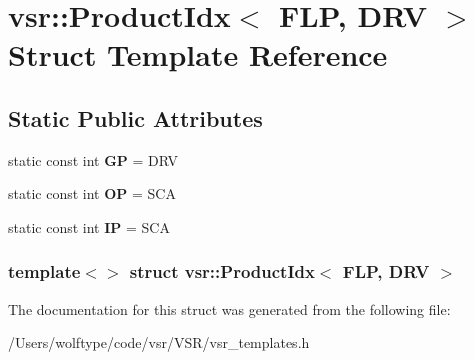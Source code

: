 \hypertarget{structvsr_1_1_product_idx_3_01_f_l_p_00_01_d_r_v_01_4}{\section{vsr\-:\-:Product\-Idx$<$ F\-L\-P, D\-R\-V $>$ Struct Template Reference}
\label{structvsr_1_1_product_idx_3_01_f_l_p_00_01_d_r_v_01_4}
}
\subsection*{Static Public Attributes}
\begin{DoxyCompactItemize}
\item 
\hypertarget{structvsr_1_1_product_idx_3_01_f_l_p_00_01_d_r_v_01_4_a925ad1c37614c9e1fc008bd69938ea4a}{static const int {\bfseries G\-P} = D\-R\-V}\label{structvsr_1_1_product_idx_3_01_f_l_p_00_01_d_r_v_01_4_a925ad1c37614c9e1fc008bd69938ea4a}

\item 
\hypertarget{structvsr_1_1_product_idx_3_01_f_l_p_00_01_d_r_v_01_4_a911fce2c88755a257fb53a221f76726f}{static const int {\bfseries O\-P} = S\-C\-A}\label{structvsr_1_1_product_idx_3_01_f_l_p_00_01_d_r_v_01_4_a911fce2c88755a257fb53a221f76726f}

\item 
\hypertarget{structvsr_1_1_product_idx_3_01_f_l_p_00_01_d_r_v_01_4_a63006418732a6570f39c23557e0df757}{static const int {\bfseries I\-P} = S\-C\-A}\label{structvsr_1_1_product_idx_3_01_f_l_p_00_01_d_r_v_01_4_a63006418732a6570f39c23557e0df757}

\end{DoxyCompactItemize}
\subsubsection*{template$<$$>$ struct vsr\-::\-Product\-Idx$<$ F\-L\-P, D\-R\-V $>$}



The documentation for this struct was generated from the following file\-:\begin{DoxyCompactItemize}
\item 
/\-Users/wolftype/code/vsr/\-V\-S\-R/vsr\-\_\-templates.\-h\end{DoxyCompactItemize}
